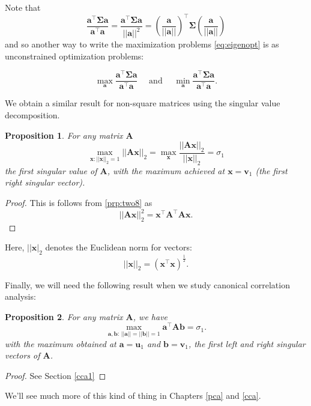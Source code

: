 \documentclass[
]{book}
\newtheorem{proposition}{Proposition}[chapter]
\theoremstyle{definition}
\theoremstyle{definition}
\theoremstyle{definition}
\theoremstyle{definition}
\theoremstyle{remark}
\begin{document}
Note that \[\frac{\mathbf a^\top \boldsymbol{\Sigma}\mathbf a}{\mathbf a^\top\mathbf a}=\frac{\mathbf a^\top \boldsymbol{\Sigma}\mathbf a}{||\mathbf a||^2} = (\frac{\mathbf a}{||\mathbf a||})^\top \boldsymbol{\Sigma}(\frac{\mathbf a}{||\mathbf a||})\]
and so another way to write the maximization problems \eqref{eq:eigenopt} is as unconstrained optimization problems:

\[\max_{\mathbf a}\frac{\mathbf a^\top \boldsymbol{\Sigma}\mathbf a}{\mathbf a^\top\mathbf a}\quad \mbox{ and } \quad \min_{\mathbf a}\frac{\mathbf a^\top \boldsymbol{\Sigma}\mathbf a}{\mathbf a^\top\mathbf a}.\]

We obtain a similar result for non-square matrices using the singular value decomposition.

\begin{proposition}
\protect\hypertarget{prp:svdmax1}{}{\label{prp:svdmax1} }For any matrix \(\mathbf A\)
\[\max_{\mathbf x: ||\mathbf x||_2=1}||\mathbf A\mathbf x||_2=\max_{\mathbf x}\frac{||\mathbf A\mathbf x||_2}{||\mathbf x||_2}=\sigma_1\]
the first singular value of \(\mathbf A\), with the maximum achieved at \(\mathbf x=\mathbf v_1\) (the first right singular vector).
\end{proposition}

\begin{proof}
This is follows from \ref{prp:two8} as
\[||\mathbf A\mathbf x||_2^2=\mathbf x^\top \mathbf A^\top\mathbf A\mathbf x.\]
\end{proof}

Here, \(||\mathbf x|_2\) denotes the Euclidean norm for vectors:
\[||\mathbf x||_2 = (\mathbf x^\top \mathbf x)^{\frac{1}{2}}.\]

Finally, we will need the following result when we study canonical correlation analysis:

\begin{proposition}
\protect\hypertarget{prp:svdmax2}{}{\label{prp:svdmax2} }For any matrix \(\mathbf A\), we have
\[
\max_{\mathbf a, \mathbf b:\, \vert \vert \mathbf a\vert \vert=\vert \vert \mathbf b\vert \vert =1} \mathbf a^\top \mathbf A\mathbf b=\sigma_1.
\]
with the maximum obtained at \(\mathbf a=\mathbf u_1\) and \(\mathbf b=\mathbf v_1\), the first left and right singular vectors of \(\mathbf A\).
\end{proposition}

\begin{proof}
See Section \ref{cca1}
\end{proof}

We'll see much more of this kind of thing in Chapters \ref{pca} and \ref{cca}.
\end{document}
